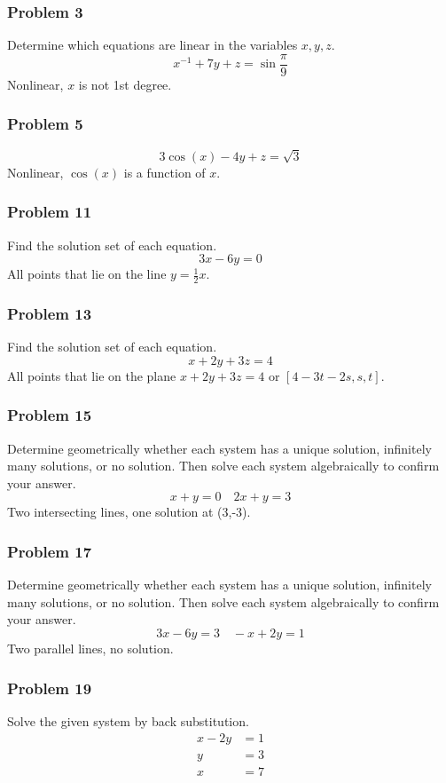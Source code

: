 \documentclass[letterpaper, 12pt]{math}
\begin{document}
\subsubsection*{Problem 3}
Determine which equations are linear in the variables \( x,y,z \).
\[ x^{-1}+7y+z = \sin\frac{\pi}{9} \]
Nonlinear, \( x \) is not 1st degree.

\subsubsection*{Problem 5}
\[ 3\cos(x)-4y+z = \sqrt{3} \]
Nonlinear, \( \cos(x) \) is a function of \( x \).

\subsubsection*{Problem 11}
Find the solution set of each equation.
\[ 3x-6y = 0 \]
All points that lie on the line \( y = \frac{1}{2}x \).

\subsubsection*{Problem 13}
Find the solution set of each equation.
\[ x+2y+3z = 4 \]
All points that lie on the plane \( x+2y+3z = 4 \) or \( [4-3t-2s,s,t] \).

\subsubsection*{Problem 15}
Determine geometrically whether each system has a unique solution, infinitely
many solutions, or no solution. Then solve each system algebraically to confirm
your answer.
\[ x+y = 0 \quad 2x+y = 3 \]
Two intersecting lines, one solution at (3,-3).

\subsubsection*{Problem 17}
Determine geometrically whether each system has a unique solution, infinitely
many solutions, or no solution. Then solve each system algebraically to confirm
your answer.
\[ 3x-6y = 3 \quad -x+2y = 1 \]
Two parallel lines, no solution.

\subsubsection*{Problem 19}
Solve the given system by back substitution.
\begin{align*}
  x-2y &= 1 \\
  y &= 3 \\
  x &= 7
\end{align*}
\end{document}
